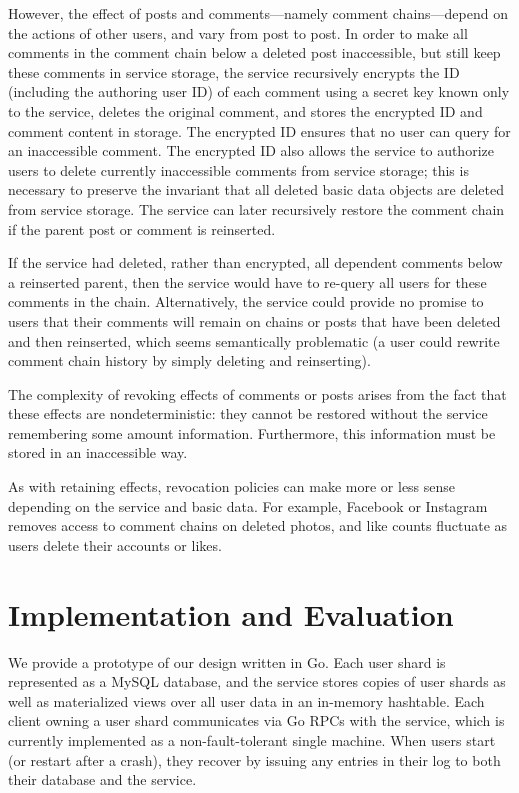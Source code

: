 \documentclass[letterpaper,twocolumn,10pt]{article}
\begin{document}
However, the effect of posts and comments---namely comment chains---depend on the actions of other users, and vary from post to post.
In order to make all comments in the comment chain below a deleted post inaccessible, but still keep these comments in service storage, the service recursively encrypts the ID (including the authoring user ID) of each comment using a secret key known only to the service, deletes 
the original comment, and stores the encrypted ID and comment content in storage.
The encrypted ID ensures that no user can query for an inaccessible comment. 
The encrypted ID also allows the service to authorize users to delete currently inaccessible comments from service storage; 
this is necessary to preserve the invariant that
all deleted basic data objects are deleted from service storage.
The service can later recursively restore the comment chain if the parent post or comment is reinserted.

If the service had deleted, rather than encrypted, all dependent comments below a reinserted parent, then the service would have to re-query all users for these comments in the chain. Alternatively, the service could provide no promise to users that their comments will remain on chains or posts that have been deleted and then reinserted, which seems semantically problematic (a user could rewrite comment chain history by simply 
deleting and reinserting). 

The complexity of revoking effects of comments or posts arises from the fact that these effects are nondeterministic: they cannot be restored without the service remembering some amount information. Furthermore, this information must be stored in an inaccessible way.

As with retaining effects, revocation policies can make more or less sense depending on the service and basic data. For example, Facebook or Instagram removes access to comment chains on deleted photos, and like counts fluctuate as users delete their accounts or likes.

\section{Implementation and Evaluation}
We provide a prototype of our design written in Go. Each user shard is represented as a MySQL database, and the service stores copies of user shards as well as materialized views over all user data in an in-memory hashtable. Each client owning a user shard communicates via Go RPCs with the service, which is currently implemented as a non-fault-tolerant single machine.
When users start (or restart after a crash), they recover by issuing any entries in their log to both their database and the service.
\end{document}
